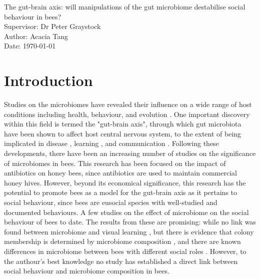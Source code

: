 \documentclass[11pt]{article}
\begin{document}
    \begin{titlepage}\centering
    \vspace*{\fill}
    \LARGE The gut-brain axis: will manipulations of the gut microbiome destabilise social behaviour in bees?\\
    \vspace{\baselineskip}
    \LARGE Supervisor: Dr Peter Graystock\\
    \vspace{\baselineskip}
    \normalsize Author: Acacia Tang\\
    \normalsize Date: {\today}
    \vspace*{\fill}
    \end{titlepage}
  
    \newpage
    \section{Introduction}
        Studies on the microbiomes have revealed their influence on a wide range of host conditions including health, behaviour, and evolution
        \cite{}.
        One important discovery within this field is termed the "gut-brain axis",
        through which gut microbiota have been shown to affect host central nervous system,
        to the extent of being implicated in disease
        \cite{},
        learning
        \cite{},
        and communication
        \cite{}.
        Following these developments,
        there have been an increasing number of studies on the significance of microbiomes in bees.
        This research has been focused on the impact of antibiotics on honey bees, since antibiotics are used to maintain commercial honey hives.
        However, beyond its economical significance, this research has the potential to promote bees as a model for the gut-brain axis as it pertains to social behaviour,
        since bees are eusocial species with well-studied and documented behaviours.
        A few studies on the effect of microbiome on the social behaviour of bees to date.
        The results from these are promising: while no link was found between microbiome and visual learning
        \cite{leger2020gut},
        but there is evidence that colony membership is determined by microbiome composition
        \cite{vernier2020gut},
        and there are known differences in microbiome between bees with different social roles
        \cite{jones2018gut}.
        However, to the authour's best knowledge no study has established a direct link between social behaviour and microbiome composition in bees.
        
\end{document}
